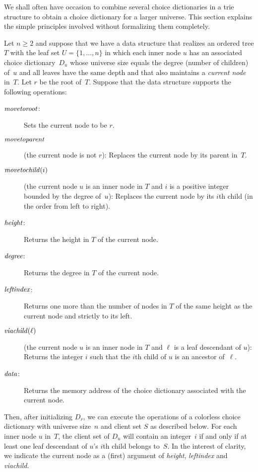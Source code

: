 \documentclass[envcountsame,envcountsect,undated,nolinenumbers]{lnthi}
\def\Tvn#1{\hbox{\textit{#1\/}}}
\begin{document}
We shall often have occasion to combine several
choice dictionaries in a trie structure to
obtain a choice dictionary
for a larger universe.
This section explains the simple principles
involved without formalizing them completely.

Let $n\ge 2$ and suppose that we have a data
structure that realizes an ordered tree $T$
with the leaf set $U=\{1,\ldots,n\}$ in which
each inner
node $u$ has an associated choice dictionary~$D_u$
whose universe size equals the degree
(number of children) of~$u$
and all leaves have the same depth and that
also maintains a \emph{current node} in~$T$.
Let $r$ be the root of~$T$.
Suppose that the data structure supports
the following operations:

\begin{description}
\item[\normalfont$\Tvn{movetoroot}$:]
Sets the current node to be $r$.
\item[\normalfont$\Tvn{movetoparent}$]
(the current node is not $r$):
Replaces the current node by its parent in~$T$.
\item[\normalfont$\Tvn{movetochild}(i)$]
(the current node $u$ is an inner node in $T$
and $i$ is a positive integer bounded by the
degree of~$u$):
Replaces the current node by its $i$th child
(in the order from left to right).
\item[\normalfont$\Tvn{height}$:]
Returns the height in $T$ of the current node.
\item[\normalfont$\Tvn{degree}$:]
Returns the degree in $T$ of the current node.
\item[\normalfont$\Tvn{leftindex}$:]
Returns one more than the number of nodes in $T$ of the same
height as the current node and strictly to its left.
\item[\normalfont$\Tvn{viachild}(\ell)$]
(the current node $u$ is an inner node in $T$ and
$\ell$ is a leaf descendant of $u$):
Returns the integer $i$ such that the $i$th child
of $u$ is an ancestor of~$\ell$.
\item[\normalfont$\Tvn{data}$:]
Returns the memory address of the choice
dictionary associated with the current node.
\end{description}

Then, after initializing $D_r$,
we can execute the operations 
of a colorless choice dictionary
with universe size~$n$ and client set $S$
as described below.
For each inner node $u$ in~$T$,
the client set of $D_u$ will contain an integer~$i$
if and only if at least one leaf descendant of
$u$'s $i$th child belongs to~$S$.
In the interest of clarity, we indicate the
current node as a (first) argument of
\Tvn{height}, \Tvn{leftindex} and \Tvn{viachild}.
\end{document}
